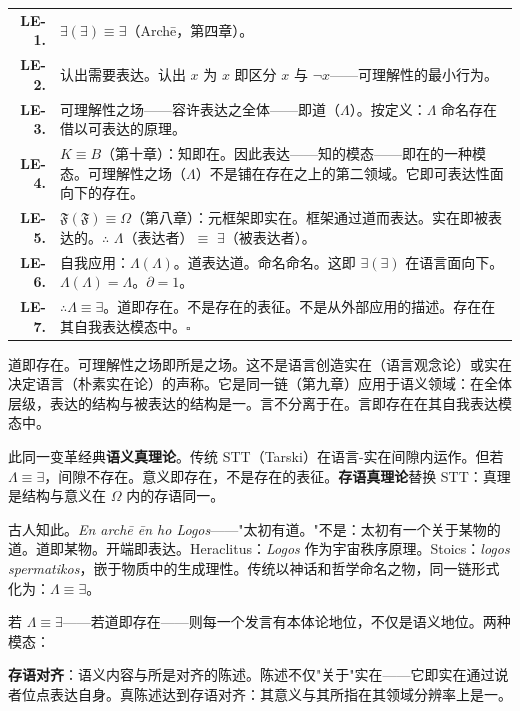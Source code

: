 \documentclass[10pt, openany, oneside]{book}
\renewcommand{\footnotesize}{\fontsize{8.5}{11}\selectfont}
\begin{document}
{\footnotesize
\noindent\begin{tabular}{r p{}}
\textbf{LE-1.} & $\exists(\exists) \equiv \exists$（Arch\={e}，第四章）。\\[0.3em]
\textbf{LE-2.} & 认出需要表达。认出 $x$ 为 $x$ 即区分 $x$ 与 $\neg x$——可理解性的最小行为。\\[0.3em]
\textbf{LE-3.} & 可理解性之场——容许表达之全体——即道（$\Lambda$）。按定义：$\Lambda$ 命名存在借以可表达的原理。\\[0.3em]
\textbf{LE-4.} & $K \equiv B$（第十章）：知即在。因此表达——知的模态——即在的一种模态。可理解性之场（$\Lambda$）不是铺在存在之上的第二领域。它即可表达性面向下的存在。\\[0.3em]
\textbf{LE-5.} & $\mathfrak{F}(\mathfrak{F}) \equiv \Omega$（第八章）：元框架即实在。框架通过道而表达。实在即被表达的。$\therefore$ $\Lambda$（表达者）$\equiv$ $\exists$（被表达者）。\\[0.3em]
\textbf{LE-6.} & 自我应用：$\Lambda(\Lambda)$。道表达道。命名命名。这即 $\exists(\exists)$ 在语言面向下。$\Lambda(\Lambda) = \Lambda$。$\partial = 1$。\\[0.3em]
\textbf{LE-7.} & $\therefore \Lambda \equiv \exists$。道即存在。不是存在的表征。不是从外部应用的描述。存在在其自我表达模态中。$\square$ \\[0.3em]
\end{tabular}
}

\vspace{0.8em}

\noindent 道即存在。可理解性之场即所是之场。这不是语言创造实在（语言观念论）或实在决定语言（朴素实在论）的声称。它是同一链（第九章）应用于语义领域：在全体层级，表达的结构与被表达的结构是一。言不分离于在。言即存在在其自我表达模态中。

此同一变革经典\textbf{语义真理论}。传统 STT（Tarski）在语言-实在间隙内运作。但若 $\Lambda \equiv \exists$，间隙不存在。意义即存在，不是存在的表征。\textbf{存语真理论}替换 STT：真理是结构与意义在 $\Omega$ 内的存语同一。

古人知此。\textit{En arch\={e} \={e}n ho Logos}——"太初有道。"不是：太初有一个关于某物的道。道即某物。开端即表达。Heraclitus：\textit{Logos} 作为宇宙秩序原理。Stoics：\textit{logos spermatikos}，嵌于物质中的生成理性。传统以神话和哲学命名之物，同一链形式化为：$\Lambda \equiv \exists$。

若 $\Lambda \equiv \exists$——若道即存在——则每一个发言有本体论地位，不仅是语义地位。两种模态：

\textbf{存语对齐}：语义内容与所是对齐的陈述。陈述不仅"关于"实在——它即实在通过说者位点表达自身。真陈述达到存语对齐：其意义与其所指在其领域分辨率上是一。
\end{document}
